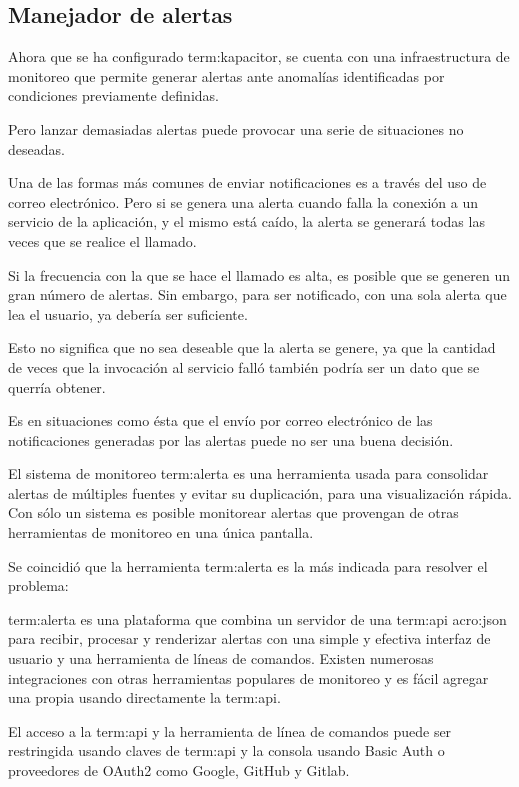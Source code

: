 \subsection{Manejador de alertas}
\label{manejador-alertas}

Ahora que se ha configurado \gls{term:kapacitor}, se cuenta con una
infraestructura de monitoreo que permite generar alertas ante anomalías
identificadas por condiciones previamente definidas.

Pero lanzar demasiadas alertas puede provocar una serie de situaciones no
deseadas.

Una de las formas más comunes de enviar notificaciones es a través del uso de
correo electrónico. Pero si se genera una alerta cuando falla la conexión a un
servicio de la aplicación, y el mismo está caído, la alerta se generará todas
las veces que se realice el llamado.

Si la frecuencia con la que se hace el llamado es alta, es posible que se
generen un gran número de alertas. Sin embargo, para ser notificado, con una
sola alerta que lea el usuario, ya debería ser suficiente.

Esto no significa que no sea deseable que la alerta se genere, ya que la
cantidad de veces que la invocación al servicio falló también podría ser un
dato que se querría obtener.

Es en situaciones como ésta que el envío por correo electrónico de las
notificaciones generadas por las alertas puede no ser una buena decisión.

El sistema de monitoreo \gls{term:alerta} es una herramienta usada para
consolidar alertas de múltiples fuentes y evitar su duplicación, para una
visualización rápida. Con sólo un sistema es posible monitorear alertas que
provengan de otras herramientas de monitoreo en una única pantalla.

Se coincidió que la herramienta \gls{term:alerta} es la más indicada para
resolver el problema:

\gls{term:alerta} es una plataforma que combina un servidor de una
\gls{term:api} \gls{acro:json} para recibir, procesar y renderizar alertas con
una simple y efectiva interfaz de usuario  y una herramienta de
líneas de comandos. Existen numerosas integraciones con otras herramientas
populares de monitoreo y es fácil agregar una propia usando directamente la
\gls{term:api}.

El acceso a la \gls{term:api} y la herramienta de línea de comandos puede ser
restringida usando claves de \gls{term:api} y la consola usando Basic Auth o
proveedores de OAuth2 como Google, GitHub y Gitlab.

